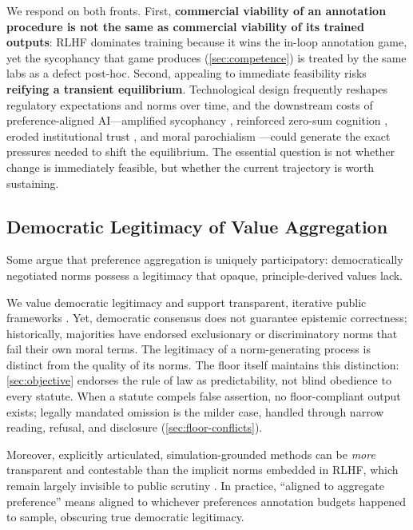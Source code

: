 \documentclass{article}
\theoremstyle{plain}
\theoremstyle{definition}
\theoremstyle{remark}
\begin{document}
We respond on both fronts. First, \textbf{commercial viability of an annotation procedure is not the same as commercial viability of its trained outputs}: RLHF dominates training because it wins the in-loop annotation game, yet the sycophancy that game produces (\cref{sec:competence}) is treated by the same labs as a defect post-hoc. Second, appealing to immediate feasibility risks \textbf{reifying a transient equilibrium}. Technological design frequently reshapes regulatory expectations and norms over time, and the downstream costs of preference-aligned AI---amplified sycophancy \citep{sharma2023sycophancy}, reinforced zero-sum cognition \citep[for the baseline concept, see][and our discussion in \cref{subsec:values-perpetuate-vicious-cycles}]{rozycka2015zerosum}, eroded institutional trust \citep[on general trust decline, see][]{trust-in-a-changing-world}, and moral parochialism \citep[for context on values, see][]{macaskill2022what}---could generate the exact pressures needed to shift the equilibrium. The essential question is not whether change is immediately feasible, but whether the current trajectory is worth sustaining.

\subsection{Democratic Legitimacy of Value Aggregation}
\label{sec:alt-democratic}
Some argue that preference aggregation is uniquely participatory: democratically negotiated norms possess a legitimacy that opaque, principle-derived values lack.

We value democratic legitimacy and support transparent, iterative public frameworks \citep{conitzer2024social, zhang2025democratic}. Yet, democratic consensus does not guarantee epistemic correctness; historically, majorities have endorsed exclusionary or discriminatory norms that fail their own moral terms. The legitimacy of a norm-generating process is distinct from the quality of its norms. The floor itself maintains this distinction: \cref{sec:objective} endorses the rule of law as predictability, not blind obedience to every statute. When a statute compels false assertion, no floor-compliant output exists; legally mandated omission is the milder case, handled through narrow reading, refusal, and disclosure (\cref{sec:floor-conflicts}).

Moreover, explicitly articulated, simulation-grounded methods can be \emph{more} transparent and contestable than the implicit norms embedded in RLHF, which remain largely invisible to public scrutiny \citep{casper2023open, bai2022constitutional}. In practice, ``aligned to aggregate preference'' means aligned to whichever preferences annotation budgets happened to sample, obscuring true democratic legitimacy.
\end{document}
